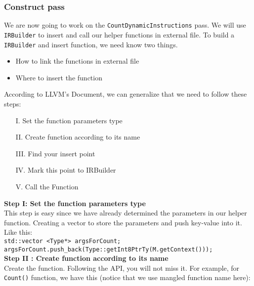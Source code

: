 \documentclass{acm_proc_article-sp}
\begin{document}
\subsubsection{Construct pass}
We are now going to work on the {\tt CountDynamicInstructions} pass. We will use {\tt IRBuilder} to insert and call our helper functions in external file. 
To build a {\tt IRBuilder} and insert function, we need know two things.
\begin{itemize}
\vspace{-0.1in}
\item How to link the functions in external file 
\item Where to insert the function
\end{itemize}
According to LLVM's Document, we can generalize that we need to follow these steps:
\begin{itemize}
\vspace{-0.1in}
\small
\item[I.] Set the function parameters type 
\item[II.] Create function according to its name
\item[III.] Find your insert point
\item[IV.] Mark this point to IRBuilder 
\item[V.] Call the Function
\vspace{-0.1in}
\end{itemize}

\textbf{Step I:  Set the function parameters type} \\
This step is easy since we have already determined the parameters in our helper function.
Creating a vector to store the parameters and push key-value into it. Like this:\\
{\tt std::vector <Type*> argsForCount;\\
 argsForCount.push\_back(Type::getInt8PtrTy(M.getContext()));}
 \vspace{0.05in}\\
\textbf{Step II : Create function according to its name} \\
Create the function. Following the API, you will not miss it. For example, for {\tt Count()} function, we have this (notice that we use mangled function name here):
\vspace{-0.02in}

\end{document}
